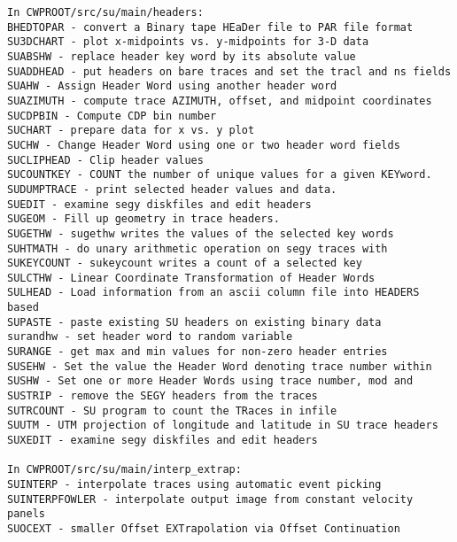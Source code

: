 {\begin{verbatim}
In CWPROOT/src/su/main/headers:
BHEDTOPAR - convert a Binary tape HEaDer file to PAR file format	
SU3DCHART - plot x-midpoints vs. y-midpoints for 3-D data	
SUABSHW - replace header key word by its absolute value	
SUADDHEAD - put headers on bare traces and set the tracl and ns fields
SUAHW - Assign Header Word using another header word			
SUAZIMUTH - compute trace AZIMUTH, offset, and midpoint coordinates    
SUCDPBIN - Compute CDP bin number					
SUCHART - prepare data for x vs. y plot			
SUCHW - Change Header Word using one or two header word fields	
SUCLIPHEAD - Clip header values					
SUCOUNTKEY - COUNT the number of unique values for a given KEYword.	
SUDUMPTRACE - print selected header values and data.              
SUEDIT - examine segy diskfiles and edit headers			
SUGEOM - Fill up geometry in trace headers.                              
SUGETHW - sugethw writes the values of the selected key words		
SUHTMATH - do unary arithmetic operation on segy traces with 	
SUKEYCOUNT - sukeycount writes a count of a selected key    
SULCTHW - Linear Coordinate Transformation of Header Words		
SULHEAD - Load information from an ascii column file into HEADERS based
SUPASTE - paste existing SU headers on existing binary data	
surandhw - set header word to random variable 		
SURANGE - get max and min values for non-zero header entries	
SUSEHW - Set the value the Header Word denoting trace number within	
SUSHW - Set one or more Header Words using trace number, mod and	
SUSTRIP - remove the SEGY headers from the traces		
SUTRCOUNT - SU program to count the TRaces in infile		
SUUTM - UTM projection of longitude and latitude in SU trace headers  
SUXEDIT - examine segy diskfiles and edit headers			

In CWPROOT/src/su/main/interp_extrap:
SUINTERP - interpolate traces using automatic event picking		
SUINTERPFOWLER - interpolate output image from constant velocity panels
SUOCEXT - smaller Offset EXTrapolation via Offset Continuation        


\end{verbatim}}
